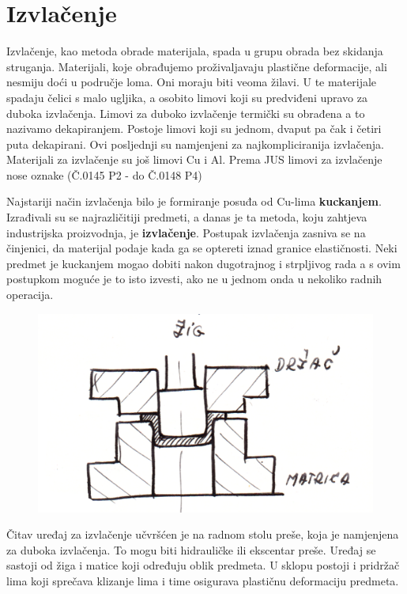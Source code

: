\documentclass[a4paper,12pt]{article}
\numberwithin{figure}{section}
\begin{document}
\section{Izvlačenje}
Izvlačenje, kao metoda obrade materijala, spada u grupu obrada bez skidanja struganja. Materijali, koje obrađujemo proživaljavaju plastične deformacije, ali nesmiju doći u područje loma. Oni moraju biti veoma žilavi. U te materijale spadaju čelici s malo ugljika, a osobito limovi koji su  predviđeni upravo za duboka izvlačenja. Limovi za duboko izvlačenje termički su obrađena a to nazivamo dekapiranjem. Postoje limovi koji su jednom, dvaput pa čak i četiri puta dekapirani. Ovi posljednji su namjenjeni za najkompliciranija izvlačenja. Materijali za izvlačenje su još limovi Cu i Al. Prema JUS limovi za izvlačenje nose oznake (Č.0145 P2 - do Č.0148 P4)\par  
Najstariji način izvlačenja bilo je formiranje posuđa od Cu-lima \textbf{kuckanjem}. Izrađivali su se najrazličitiji predmeti, a danas je ta metoda, koju zahtjeva industrijska proizvodnja, je \textbf{izvlačenje}. Postupak izvlačenja zasniva se na činjenici, da materijal podaje kada ga se optereti iznad granice elastičnosti. Neki predmet je kuckanjem mogao dobiti nakon dugotrajnog i strpljivog rada a s ovim postupkom moguće je to isto izvesti, ako ne u jednom onda u nekoliko radnih operacija. \par
\begin{figure}[!h]
\centering
\includegraphics[scale=0.15]{image_45-1.png}
\end{figure}
\FloatBarrier
Čitav uređaj za izvlačenje učvršćen je na radnom stolu preše, koja je namjenjena za duboka izvlačenja. To mogu biti hidrauličke ili ekscentar preše. Uređaj se sastoji od žiga i matice koji određuju oblik predmeta. U sklopu postoji i pridržač lima koji sprečava klizanje lima i time osigurava plastičnu deformaciju predmeta. \par
\end{document}
